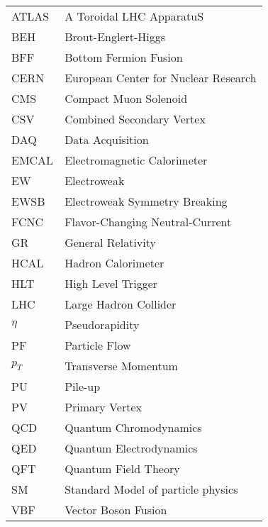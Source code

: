 \hspace*{-1.25in}
\vspace{12pt}
\begin{spacing}{1.0}
	\begin{longtable}[htbp]{@{}p{} p{}@{}}
		ATLAS	&	A Toroidal LHC ApparatuS\\	[2ex]
		BEH	&	Brout-Englert-Higgs\\	[2ex]
		BFF	&	Bottom Fermion Fusion\\	[2ex]
		CERN & European Center for Nuclear Research\\ [2ex]
		CMS	&	Compact Muon Solenoid\\	[2ex]		
		CSV	&	Combined Secondary Vertex\\	[2ex]				
		DAQ	&	Data Acquisition \\	[2ex]						
		EMCAL & Electromagnetic Calorimeter\\ [2ex]
		EW	&	Electroweak\\	[2ex]
		EWSB	&	Electroweak Symmetry Breaking\\	[2ex]	
		FCNC &  Flavor-Changing Neutral-Current\\  [2ex]
		GR &  General Relativity\\  [2ex]		
		HCAL & Hadron Calorimeter\\ [2ex]
		HLT  & High Level Trigger\\ [2ex]	
		LHC  & Large Hadron Collider\\ [2ex]
		$\eta$ & Pseudorapidity\\ [2ex]
		PF   & Particle Flow\\ [2ex]
		$p_{T}$ & Transverse Momentum\\ [2ex]		
		PU & Pile-up\\ [2ex]				
		PV & Primary Vertex\\ [2ex]						
		QCD	&	Quantum Chromodynamics\\	[2ex]
		QED	&	Quantum Electrodynamics\\	[2ex]		
		QFT	&	Quantum Field Theory\\	[2ex]
		SM	&	Standard Model of particle physics\\	[2ex]
		VBF	&	Vector Boson Fusion\\	[2ex]
	\end{longtable}
\end{spacing}

\pagebreak{}